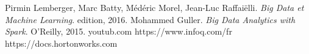 


\begin{thebibliography}{ABC}	
     Pirmin Lemberger, Marc Batty, Médéric Morel, Jean-Luc Raffaiëlli. \emph{Big Data et Machine Learning}. edition, 2016.
     Mohammed Guller. \emph{Big Data Analytics with Spark}. O'Reilly, 2015.
      youtub.com
       https://www.infoq.com/fr
      https://docs.hortonworks.com 
\end{thebibliography}

